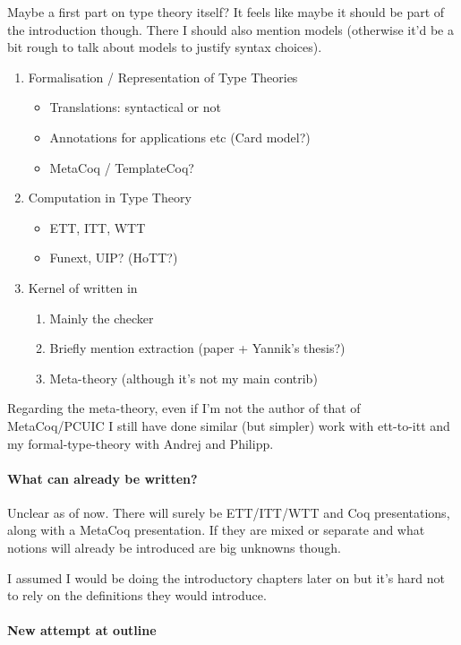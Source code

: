 Maybe a first part on type theory itself?
It feels like maybe it should be part of the introduction though.
There I should also mention models (otherwise it'd be a bit rough to talk
about models to justify syntax choices).

\begin{enumerate}
  \item Formalisation / Representation of Type Theories
    \begin{itemize}
      \item Translations: syntactical or not
      \item Annotations for applications etc (Card model?)
      \item MetaCoq / TemplateCoq?
    \end{itemize}
  \item Computation in Type Theory
    \begin{itemize}
      \item ETT, ITT, WTT
      \item Funext, UIP? (HoTT?)
    \end{itemize}
  \item Kernel of \Coq written in \Coq
    \begin{enumerate}
      \item Mainly the checker
      \item Briefly mention extraction (paper + Yannik's thesis?)
      \item Meta-theory (although it's not my main contrib)
    \end{enumerate}
\end{enumerate}

Regarding the meta-theory, even if I'm not the author of that of MetaCoq/PCUIC
I still have done similar (but simpler) work with ett-to-itt and my
formal-type-theory with Andrej and Philipp.

\paragraph{What can already be written?}

Unclear as of now. There will surely be ETT/ITT/WTT and Coq presentations,
along with a MetaCoq presentation. If they are mixed or separate and what
notions will already be introduced are big unknowns though.

I assumed I would be doing the introductory chapters later on but it's hard not
to rely on the definitions they would introduce.

\paragraph{New attempt at outline}

